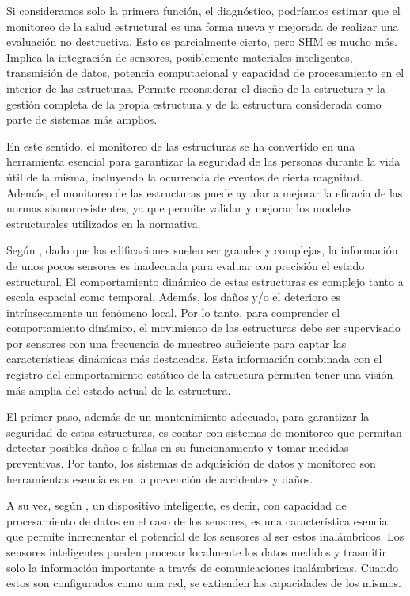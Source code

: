 Si consideramos solo la primera función, el diagnóstico, podríamos estimar que el monitoreo de la salud estructural es una forma nueva y mejorada de realizar una evaluación no destructiva. Esto es parcialmente cierto, pero SHM es mucho más. Implica la integración de sensores, posiblemente materiales inteligentes, transmisión de datos, potencia computacional y capacidad de procesamiento en el interior de las estructuras. Permite reconsiderar el diseño de la estructura y la gestión completa de la propia estructura y de la estructura considerada como parte de sistemas más amplios.



En este sentido, el monitoreo de las estructuras se ha convertido en una herramienta esencial para garantizar la seguridad de las personas durante la vida útil de la misma, incluyendo la ocurrencia de eventos de cierta magnitud. Además, el monitoreo de las estructuras puede ayudar a mejorar la eficacia de las normas sismorresistentes, ya que permite validar y mejorar los modelos estructurales utilizados en la normativa.

Según \citep{nagayama2007structural}, dado que las edificaciones suelen ser grandes y complejas, la información
de unos pocos sensores es inadecuada para evaluar con precisión el estado estructural. El
comportamiento dinámico de estas estructuras es complejo tanto a escala espacial como temporal. Además,
los daños y/o el deterioro es intrínsecamente un fenómeno local. Por lo tanto, para comprender el
comportamiento dinámico, el movimiento de las estructuras debe ser supervisado por sensores
con una frecuencia de muestreo suficiente para captar las características dinámicas más destacadas. Esta información combinada con el registro del comportamiento estático de la estructura permiten tener una visión más amplia del estado actual de la estructura.


El primer paso, además de un mantenimiento adecuado, para garantizar la seguridad de estas estructuras, es contar con sistemas de monitoreo que permitan detectar posibles daños o fallas en su funcionamiento y tomar medidas preventivas. Por tanto, los sistemas de adquisición de datos y monitoreo son herramientas esenciales en la prevención de accidentes y daños.

A su vez, según \citep{nagayama2007structural}, un dispositivo inteligente, es decir, con capacidad de procesamiento de datos en el caso de los sensores, es una característica esencial que permite incrementar el potencial de los sensores al ser estos inalámbricos. Los sensores inteligentes pueden procesar localmente los datos medidos y trasmitir solo la información importante a través de comunicaciones inalámbricas. Cuando estos son configurados como una red, se extienden las capacidades de los mismos.

